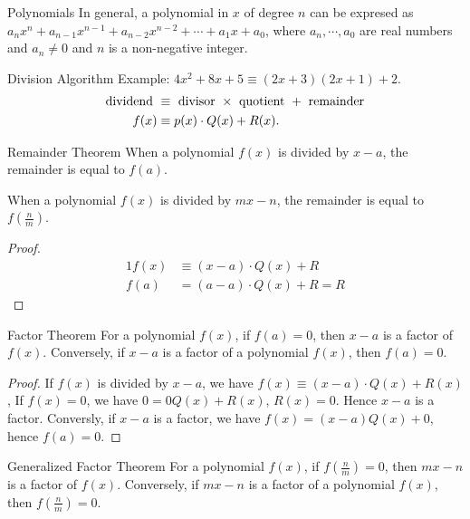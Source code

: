 
\begin{mysubsection}{}
    \begin{definition}[def:]{Polynomials}
        In general, a polynomial in $x$ of degree $n$ can be expresed as $a_nx^n+a_{n-1}x^{n-1}+a_{n-2}x^{n-2}+\cdots +a_1x+a_0$, where $a_n,\cdots ,a_0$ are real numbers and $a_n\neq 0$ and $n$ is a non-negative integer.
    \end{definition}
    
    \begin{definition}[def:]{Division Algorithm}
    Example: $4x^2+8x+5\equiv (2x+3)(2x+1)+2$.
        \begin{alignat*}{1}
            \textnormal{dividend }&\equiv \textnormal{ divisor }\times \textnormal{ quotient }+\textnormal{ remainder}\\
            f(x)&\equiv p(x)\cdot Q(x)+R(x).
        \end{alignat*}
    \end{definition}

    \begin{theorem}[thm:]{Remainder Theorem}
        When a polynomial $f(x)$ is divided by $x-a$, the remainder is equal to $f(a)$.

        When a polynomial $f(x)$ is divided by $mx-n$, the remainder is equal to $f\left(\frac{n}{m}\right)$.
    \end{theorem}

    \begin{proof}
        \begin{alignat*}{1}
            f(x)&\equiv (x-a)\cdot Q(x)+R\\
            f(a)&= (a-a)\cdot Q(x)+R = R
        \end{alignat*}
    \end{proof}

    \begin{theorem}[thm:]{Factor Theorem}
        For a polynomial $f(x)$, if $f(a)=0$, then $x-a$ is a factor of $f(x)$. Conversely, if $x-a$ is a factor of a polynomial $f(x)$, then $f(a)=0$.
    \end{theorem}

    \begin{proof}
        If $f(x)$ is divided by $x-a$, we have $f(x)\equiv (x-a)\cdot Q(x)+R(x)$, If $f(x)=0$, we have $0=0Q(x)+R(x)$, $R(x)=0$. Hence $x-a$ is a factor. Conversly, if $x-a$ is a factor, we have $f(x)=(x-a)Q(x)+0$, hence $f(a)=0$. 
    \end{proof}

    \begin{theorem}[thm:]{Generalized Factor Theorem}
        For a polynomial $f(x)$, if $f\left(\frac{n}{m}\right)=0$, then $mx-n$ is a factor of $f(x)$. Conversely, if $mx-n$ is a factor of a polynomial $f(x)$, then $f\left(\frac{n}{m}\right)=0$.
    \end{theorem}
\end{mysubsection}

